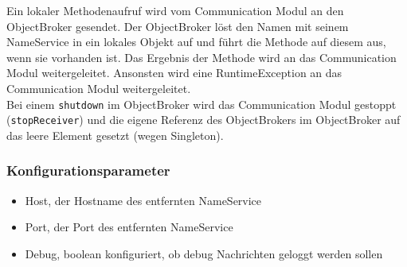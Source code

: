 \documentclass{article}
\begin{document}
Ein lokaler Methodenaufruf wird vom Communication Modul an den ObjectBroker gesendet. Der ObjectBroker löst den Namen
mit seinem NameService in ein lokales Objekt auf und führt die Methode auf diesem aus, wenn sie vorhanden ist. Das
Ergebnis der Methode wird an das Communication Modul weitergeleitet. Ansonsten wird eine RuntimeException an das
Communication Modul weitergeleitet.\\

Bei einem \texttt{shutdown} im ObjectBroker wird das Communication Modul gestoppt (\texttt{stopReceiver}) und die
eigene Referenz des ObjectBrokers im ObjectBroker auf das leere Element gesetzt (wegen Singleton).

\subsubsection{Konfigurationsparameter}

\begin{itemize}
    \item Host, der Hostname des entfernten NameService
    \item Port, der Port des entfernten NameService
	\item Debug, boolean konfiguriert, ob debug Nachrichten geloggt werden sollen
\end{itemize}
\end{document}
